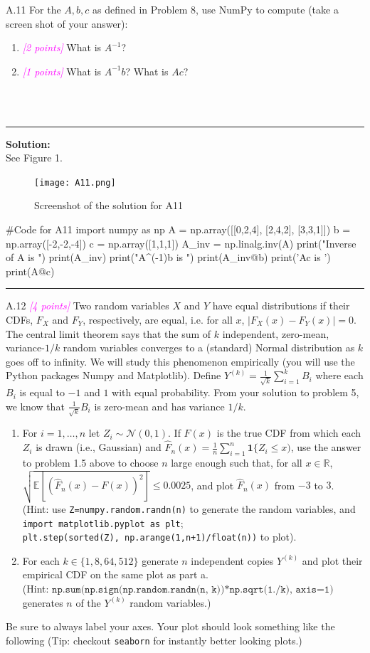 \documentclass{article}
\newcommand{\field}[1]{\mathbb{#1}}
\newcommand{\1}{\mathbf{1}}
\newcommand{\E}{\mathbb{E}}
\newcommand{\R}{\field{R}} %
\newcommand{\points}[1]{\small\textcolor{magenta}{\emph{[#1 points]}} \normalsize}
\begin{document}
A.11 For the $A, b, c$ as defined in Problem 8, use
  NumPy to compute (take a screen shot of your answer):
  \begin{enumerate}
  \item \points{2} What is $A^{-1}$?
  \item \points{1} What is $A^{-1}b$? What is $Ac$?
  \end{enumerate}\\
        \\
            \noindent\rule{\textwidth}{1pt}
            {\bf Solution:}\\  
            See Figure 1.
            \begin{figure}[h!]
            \centering
            \texttt{[image: A11.png]}
            \caption{Screenshot of the solution for A11}
            \end{figure}
\begin{python}
#Code for A11
import numpy as np
A = np.array([[0,2,4], [2,4,2], [3,3,1]])
b = np.array([-2,-2,-4])
c = np.array([1,1,1])
A_inv = np.linalg.inv(A)
print("Inverse of A is ")
print(A_inv)
print("A^(-1)b is ")
print(A_inv@b)
print('Ac is ')
print(A@c)
\end{python}
\noindent\rule{\textwidth}{1pt}
A.12 \points{4} Two random variables $X$ and $Y$ have equal
  distributions if their CDFs, $F_X$ and $F_Y$, respectively, are
  equal, i.e. for all $x$, $ |F_X(x) - F_Y(x)| = 0$. 
The central limit theorem says that the sum of $k$ independent,
zero-mean, variance-$1/k$ random variables converges to a (standard) Normal distribution as $k$ goes off to infinity.  
We will study this phenomenon empirically (you will use the Python packages Numpy and Matplotlib). 
Define $Y^{(k)} = \frac{1}{\sqrt{k}} \sum_{i=1}^k B_i$ where each $B_i$ is equal to $-1$ and $1$ with equal probability.
From your solution to problem 5, we know that $\frac{1}{\sqrt{k}} B_i$ is zero-mean and has variance $1/k$.
\begin{enumerate}
\item For $i=1,\dots,n$ let $Z_i \sim \mathcal{N}(0,1)$. If
  $F(x)$ is the true CDF from which each $Z_i$ is drawn (i.e.,
  Gaussian) and $\widehat{F}_n(x) = \frac{1}{n} \sum_{i=1}^n
  \1\{ Z_i \leq x)$, use the answer to problem 1.5  above to choose
  $n$ large enough such that, for all $x \in \R$, $ \sqrt{\E[
    (\widehat{F}_n(x)-F(x))^2 ]} \leq 0.0025$, and plot
  $\widehat{F}_n(x)$ from $-3$ to $3$. \\(Hint: use
  \texttt{Z=numpy.random.randn(n)} to generate the random
  variables, and \texttt{import matplotlib.pyplot as plt};\\
  \texttt{plt.step(sorted(Z), np.arange(1,n+1)/float(n))} to
  plot). 
\item For each $k \in \{1, 8, 64, 512\}$ generate $n$
  independent copies $Y^{(k)}$ and plot their empirical CDF on
  the same plot as part a.\\ (Hint: 
  $\texttt{np.sum(np.sign(np.random.randn(n,
    k))*np.sqrt(1./k), axis=1)}$ generates $n$ of the
  $Y^{(k)}$ random variables.) 
\end{enumerate}
Be sure to always label your axes. 
Your plot should look something like the following (Tip: checkout \texttt{seaborn} for instantly better looking plots.)
\end{document}
